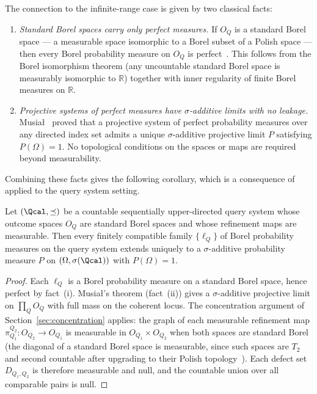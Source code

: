The connection to the infinite-range case is given by two classical
facts:
\begin{enumerate}[label=(\roman*)]
\item \emph{Standard Borel spaces carry only perfect measures.}
  If $O_Q$ is a standard Borel space --- a measurable space
  isomorphic to a Borel subset of a Polish space --- then every
  Borel probability measure on $O_Q$ is perfect~\cite{Bogachev2007,
  Fremlin2003}.  This follows from the Borel isomorphism theorem
  (any uncountable standard Borel space is measurably isomorphic
  to $\mathbb{R}$) together with inner regularity of finite Borel
  measures on $\mathbb{R}$.
\item \emph{Projective systems of perfect measures have
  $\sigma$-additive limits with no leakage.}
  Musia{\l}~\cite{Musial1980} proved that a projective system of
  perfect probability measures over any directed index set admits a
  unique $\sigma$-additive projective limit $P$ satisfying
  $P(\Omega) = 1$.  No topological conditions on the spaces or maps
  are required beyond measurability.
\end{enumerate}
Combining these facts gives the following corollary, which is a
consequence of~\cite{Musial1980} applied to the query system setting.

\begin{corollary}
\label{cor:standard-borel}
Let $(\Qcal, \preceq)$ be a countable sequentially upper-directed
query system whose outcome spaces $O_Q$ are standard Borel spaces
and whose refinement maps are measurable.  Then every finitely
compatible family $\{\ell_Q\}$ of Borel probability measures on
the query system extends uniquely to a $\sigma$-additive probability
measure $P$ on $(\Omega, \sigma(\Qcal))$ with $P(\Omega) = 1$.
\end{corollary}

\begin{proof}
Each $\ell_Q$ is a Borel probability measure on a standard Borel
space, hence perfect by fact~(i).  Musia{\l}'s theorem (fact~(ii))
gives a $\sigma$-additive projective limit on $\prod_Q O_Q$ with
full mass on the coherent locus.  The concentration argument of
Section~\ref{sec:concentration} applies: the graph of each
measurable refinement map $\pi^{Q_2}_{Q_1}: O_{Q_2} \to O_{Q_1}$
is measurable in $O_{Q_1} \times O_{Q_2}$ when both spaces are
standard Borel (the diagonal of a standard Borel space is
measurable, since such spaces are $T_2$ and second countable after
upgrading to their Polish topology~\cite{Srivastava1998}).  Each
defect set $D_{Q_1,Q_2}$ is therefore measurable and null, and
the countable union over all comparable pairs is null.
\end{proof}

